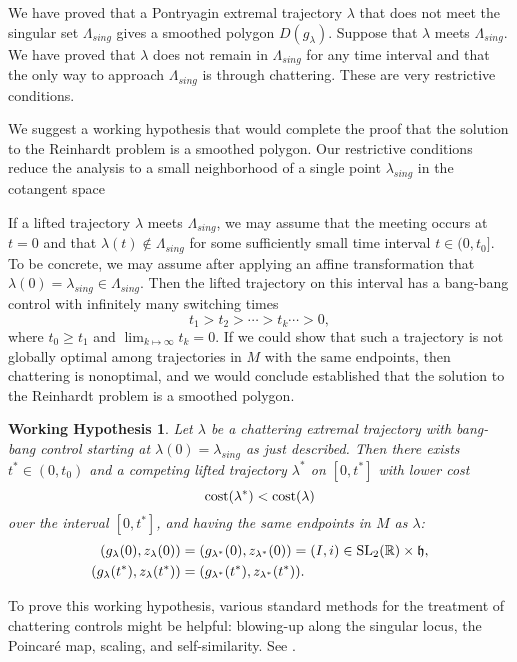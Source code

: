 \documentclass{article}
\newtheorem{working}[theorem]{Working Hypothesis}
\theoremstyle{remark}
\newcommand{\ring}[1]{\mathbb{#1}}
\newcommand{\op}[1]{\hbox{#1}}
\def\SL{\op{SL}_2(\ring{R})}
\def\h{\mathfrak h}
\newcommand\Lsing{\Lambda_{sing}}
\newcommand\lsing{\lambda_{sing}}
\begin{document}
We have proved that a Pontryagin extremal trajectory $\lambda$ that
does not meet the singular set $\Lsing$ gives a smoothed polygon
$D(g_\lambda)$.  Suppose that $\lambda$ meets $\Lsing$.  We have
proved that $\lambda$ does not remain in $\Lsing$ for any time
interval and that the only way to approach $\Lsing$ is through
chattering.  These are very restrictive conditions.


We suggest a working hypothesis that would complete the proof that the
solution to the Reinhardt problem is a smoothed polygon.  Our
restrictive conditions reduce the analysis to a small neighborhood of
a single point $\lsing$ in the cotangent space


If a lifted trajectory $\lambda$ meets $\Lsing$, we may assume that the
meeting occurs at $t=0$ and that $\lambda(t)\not\in\Lsing$ for some
sufficiently small time interval $t\in(0,t_0]$.  To be concrete, we
may assume after applying an affine transformation that
$\lambda(0)=\lsing\in\Lsing$.  Then the lifted trajectory on this interval 
has a bang-bang control with infinitely many switching times
\begin{equation}
t_1 > t_2 > \cdots > t_k \cdots > 0,
\end{equation}
where $t_0\ge t_1$ and $\lim_{k\mapsto\infty} t_k = 0$.  If we could show that such a
trajectory is not globally optimal among trajectories in $M$ with the
same endpoints, then chattering is nonoptimal, and we would conclude
established that the solution to the Reinhardt problem is a smoothed
polygon.

\begin{working}\label{work:lsing} 
  Let $\lambda$ be a chattering extremal trajectory with
  bang-bang control starting at $\lambda(0)=\lsing$ as just described.
  Then there exists $t^*\in (0,t_0)$ and a competing lifted trajectory
  $\lambda^*$ on $[0,t^*]$ with lower cost
\[
\op{cost}(\lambda^*)< \op{cost}(\lambda)
\]
over the interval $[0,t^*]$, 
and having the same endpoints in $M$ as $\lambda$:
\begin{align*}
(g_\lambda(0),z_\lambda(0))
&=(g_{\lambda^*}(0),z_{\lambda^*}(0))=(I,i)\in \SL\times\h,\\
(g_\lambda(t^*),z_\lambda(t^*))
&=(g_{\lambda^*}(t^*),z_{\lambda^*}(t^*)).
\end{align*}
\end{working}

To prove this working hypothesis, various standard methods for the
treatment of chattering controls might be helpful: blowing-up along
the singular locus, the Poincar\'e map, scaling, and
self-similarity.  See \cite{zelikin2012theory}.
\end{document}
